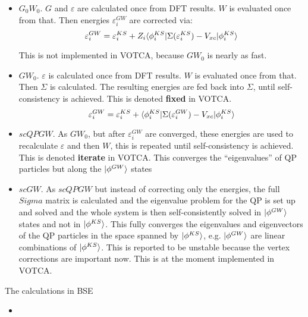 \begin{itemize}
 \item $G_0W_0$. $G$ and $\varepsilon$ are calculated once from DFT results. $W$ 
is evaluated once from that. Then energies $ \varepsilon_i^{GW}$ are corrected 
via:
 \begin{equation}
   \varepsilon_i^{GW}=\varepsilon_i^{KS}+Z_i{\langle \phi^{KS}_i \vert} 
\Sigma(\varepsilon_i^{KS})-V_{xc} {\vert \phi^{KS}_i \rangle}
 \end{equation}
 
 This is not implemented in VOTCA, because $GW_0$ is nearly as fast. 
 
 \item $GW_0$. $\varepsilon$ is calculated once from DFT results. $W$ is 
evaluated once from that. Then $\Sigma$ is calculated. The resulting energies 
are fed back into $\Sigma$, until self-consistency is achieved. This is denoted 
\textbf{fixed} in VOTCA.
 \begin{equation}
   \varepsilon_i^{GW}=\varepsilon_i^{KS}+{\langle \phi^{KS}_i \vert} 
\Sigma(\varepsilon_i^{GW})-V_{xc} {\vert \phi^{KS}_i \rangle}
 \end{equation} 
 
 
 \item $scQPGW$. As $GW_0$, but after $\varepsilon_i^{GW}$ are converged, these 
energies are used to recalculate  $\varepsilon$ and then $W$, this is repeated 
until self-consistency is achieved. This is denoted \textbf{iterate} in VOTCA. 
This converges the ``eigenvalues'' of QP particles but along the 
${\vert \phi^{GW} \rangle}$ states
 
 \item $scGW$. As $scQPGW$ but instead of correcting only the energies, the full 
$Sigma$ matrix is calculated and the eigenvalue problem for the QP is set up and 
solved and the whole system is then self-consistently solved in 
${\vert \phi^{GW} \rangle}$ states and not in   ${\vert \phi^{KS} \rangle}$. This fully converges 
the eigenvalues and eigenvectors of the QP particles in the space spanned by 
${\vert \phi^{KS} \rangle}$, e.g. ${\vert \phi^{GW} \rangle}$ are linear combinations of 
${\vert \phi^{KS} \rangle}$. This is reported to be unstable because the vertex 
corrections are important now. This is at the moment implemented in VOTCA.
 

\end{itemize}

The calculations in BSE

\begin{itemize}
 \item 
\end{itemize}


